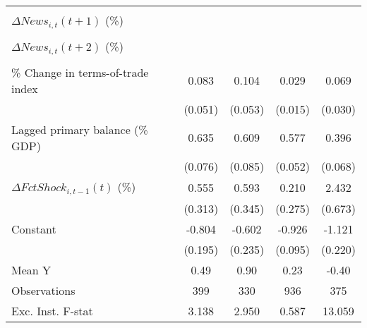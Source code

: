 {\begin{tabular}{l*{4}{c}}
                    &                     &                     &                     &                     \\
\addlinespace
$ \Delta News_{i,t}(t+1)$ (\%)&                     &                     &                     &                     \\
                    &                     &                     &                     &                     \\
\addlinespace
$ \Delta News_{i,t}(t+2)$ (\%)&                     &                     &                     &                     \\
                    &                     &                     &                     &                     \\
\addlinespace
\% Change in terms-of-trade index&       0.083         &       0.104\sym{*}  &       0.029\sym{*}  &       0.069\sym{**} \\
                    &     (0.051)         &     (0.053)         &     (0.015)         &     (0.030)         \\
\addlinespace
Lagged primary balance (\% GDP)&       0.635\sym{***}&       0.609\sym{***}&       0.577\sym{***}&       0.396\sym{***}\\
                    &     (0.076)         &     (0.085)         &     (0.052)         &     (0.068)         \\
\addlinespace
$ \Delta FctShock_{i,t-1}(t)$ (\%)&       0.555\sym{*}  &       0.593         &       0.210         &       2.432\sym{***}\\
                    &     (0.313)         &     (0.345)         &     (0.275)         &     (0.673)         \\
\addlinespace
Constant            &      -0.804\sym{***}&      -0.602\sym{**} &      -0.926\sym{***}&      -1.121\sym{***}\\
                    &     (0.195)         &     (0.235)         &     (0.095)         &     (0.220)         \\
\midrule
Mean Y              &        0.49         &        0.90         &        0.23         &       -0.40         \\
Observations        &         399         &         330         &         936         &         375         \\
Exc. Inst. F-stat   &       3.138         &       2.950         &       0.587         &      13.059         \\
\bottomrule
\end{tabular}
}
